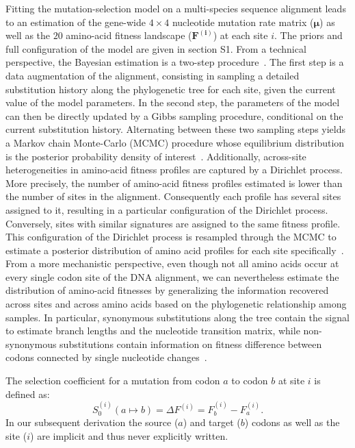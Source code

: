 \documentclass[10pt,letterpaper]{article}
\newcommand{\Sphy}{S_{0}}
\begin{document}
Fitting the mutation-selection model on a multi-species sequence alignment leads to an estimation of the gene-wide $4 \times 4$ nucleotide mutation rate matrix ($\bm{\mu}$) as well as the $20$ amino-acid fitness landscape ($\bm{F^{(i)}}$) at each site $i$.
The priors and full configuration of the model are given in section S1.
From a technical perspective, the Bayesian estimation is a two-step procedure~\cite{rodrigue_bayesian_2008}.
The first step is a data augmentation of the alignment, consisting in sampling a detailed substitution history along the phylogenetic tree for each site, given the current value of the model parameters.
In the second step, the parameters of the model can then be directly updated by a Gibbs sampling procedure, conditional on the current substitution history.
Alternating between these two sampling steps yields a Markov chain Monte-Carlo (MCMC) procedure whose equilibrium distribution is the posterior probability density of interest~\cite{lartillot_bayesian_2004, rodrigue_bayesian_2008}.
Additionally, across-site heterogeneities in amino-acid fitness profiles are captured by a Dirichlet process.
More precisely, the number of amino-acid fitness profiles estimated is lower than the number of sites in the alignment.
Consequently each profile has several sites assigned to it, resulting in a particular configuration of the Dirichlet process.
Conversely, sites with similar signatures are assigned to the same fitness profile.
This configuration of the Dirichlet process is resampled through the MCMC to estimate a posterior distribution of amino acid profiles for each site specifically~\cite{rodrigue_mutationselection_2010, lartillot_inference_2013}.
From a more mechanistic perspective, even though not all amino acids occur at every single codon site of the DNA alignment, we can nevertheless estimate the distribution of amino-acid fitnesses by generalizing the information recovered across sites and across amino acids based on the phylogenetic relationship among samples.
In particular, synonymous substitutions along the tree contain the signal to estimate branch lengths and the nucleotide transition matrix, while non-synonymous substitutions contain information on fitness difference between codons connected by single nucleotide changes~\cite{rodrigue_mutationselection_2010}.

The selection coefficient for a mutation from codon $a$ to codon $b$ at site $i$ is defined as:
\begin{equation}
\Sphy^{(i)} (a \mapsto b) = \Delta F^{(i)} = F^{(i)}_{b} - F^{(i)}_{a}.
\end{equation}
In our subsequent derivation the source ($a$) and target ($b$) codons as well as the site ($i$) are implicit and thus never explicitly written.
\end{document}
